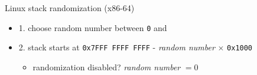 \usetikzlibrary{calc,positioning,patterns,shapes.callouts}

\begin{frame}{Linux stack randomization (x86-64)}
\begin{itemize}
    \item 1. choose random number between \texttt{0} and 
    \item 2. stack starts at \texttt{0x7FFF FFFF FFFF} - \textit{random number} $\times$ \texttt{0x1000}
        \begin{itemize}
        \item randomization disabled? \textit{random number} $= 0$
        \end{itemize}
\end{itemize}
\end{frame}

